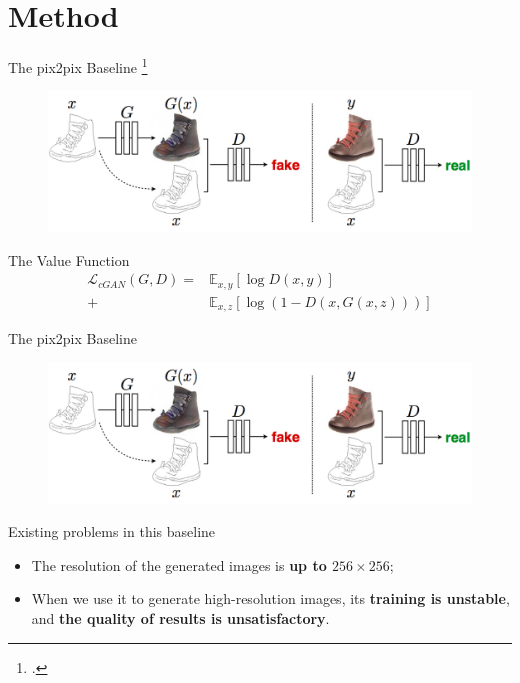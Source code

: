 \documentclass{beamer}
\begin{document}
\section{Method}
\begin{frame}{The pix2pix Baseline \footcite{Image-to-image translation with conditional adversarial networks (CVPR 2017)}}
\begin{figure}
	\centering
	\includegraphics[height=0.4\textheight]{images/baseline}
\end{figure}
%
%
\begin{beamerboxesrounded}[upper=uppercol,lower=lowercol,shadow=false]{The Value Function}
\begin{equation}
\begin{aligned}
	\mathcal{L}_{cGAN}(G,D)=&\mathbb{E}_{x,y}[\log D(x,y)]\\+&\mathbb{E}_{x,z}[\log(1-D(x,G(x,z)))]
\end{aligned}
\end{equation}
\end{beamerboxesrounded}
\end{frame}

\begin{frame}{The pix2pix Baseline }
\begin{figure}
	\centering
	\includegraphics[height=0.4\textheight]{images/baseline}
\end{figure}
%
%
\begin{beamerboxesrounded}[upper=uppercol,lower=lowercol,shadow=false]{Existing problems in this baseline}
\begin{itemize}
	\item
	The resolution of the generated images is \textbf{up to $256\times256$};
	\item 
	When we use it to generate high-resolution images, its \textbf{training is unstable}, and \textbf{the quality of results is unsatisfactory}.
\end{itemize}
\end{beamerboxesrounded}
\end{frame}
\end{document}
